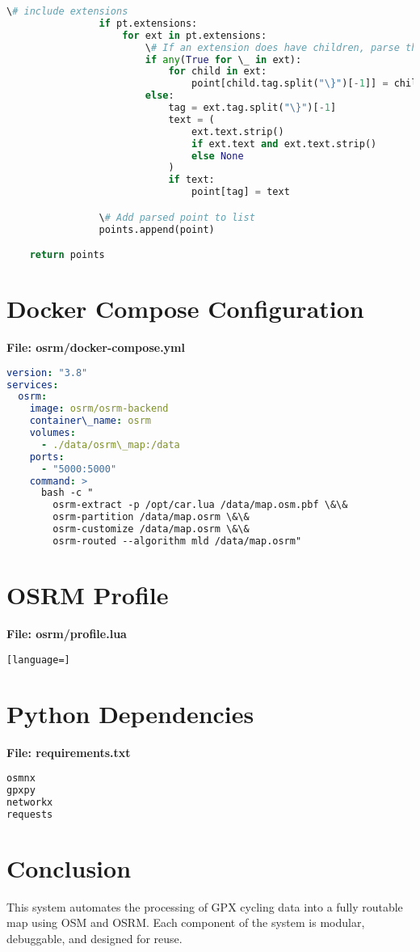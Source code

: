 \documentclass[11pt]{article}
\begin{document}
\begin{lstlisting}[language=Python]
                \# include extensions
                if pt.extensions:
                    for ext in pt.extensions:
                        \# If an extension does have children, parse them individually, otherwise add the key:value pair directly
                        if any(True for \_ in ext):
                            for child in ext:
                                point[child.tag.split("\}")[-1]] = child.text
                        else:
                            tag = ext.tag.split("\}")[-1]
                            text = (
                                ext.text.strip()
                                if ext.text and ext.text.strip()
                                else None
                            )
                            if text:
                                point[tag] = text

                \# Add parsed point to list
                points.append(point)

    return points

\end{lstlisting}

\section{Docker Compose Configuration}
\textbf{File: osrm/docker-compose.yml}
\begin{lstlisting}[language=yaml]
version: "3.8"
services:
  osrm:
    image: osrm/osrm-backend
    container\_name: osrm
    volumes:
      - ./data/osrm\_map:/data
    ports:
      - "5000:5000"
    command: >
      bash -c "
        osrm-extract -p /opt/car.lua /data/map.osm.pbf \&\&
        osrm-partition /data/map.osrm \&\&
        osrm-customize /data/map.osrm \&\&
        osrm-routed --algorithm mld /data/map.osrm"

\end{lstlisting}

\section{OSRM Profile}
\textbf{File: osrm/profile.lua}
\begin{lstlisting}[language=]

\end{lstlisting}

\section{Python Dependencies}
\textbf{File: requirements.txt}
\begin{lstlisting}[language=bash]
osmnx
gpxpy
networkx
requests

\end{lstlisting}

\section{Conclusion}
This system automates the processing of GPX cycling data into a fully routable map using OSM and OSRM. Each component of the system is modular, debuggable, and designed for reuse.
\end{document}
